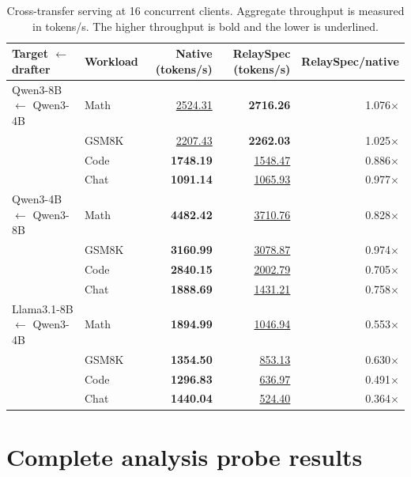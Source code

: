 \begin{table}[htbp]
\centering
\caption{Cross-transfer serving at 16 concurrent clients. Aggregate throughput is measured in tokens/s. The higher throughput is bold and the lower is underlined.}
\label{tab:transfer-serving}
\small
\begin{tabular}{llrrr}
\toprule
Target $\leftarrow$ drafter & Workload & Native (tokens/s) & RelaySpec (tokens/s) & RelaySpec/native \\
\midrule
Qwen3-8B $\leftarrow$ Qwen3-4B & Math & \underline{2524.31} & \textbf{2716.26} & 1.076$\times$ \\
 & GSM8K & \underline{2207.43} & \textbf{2262.03} & 1.025$\times$ \\
 & Code & \textbf{1748.19} & \underline{1548.47} & 0.886$\times$ \\
 & Chat & \textbf{1091.14} & \underline{1065.93} & 0.977$\times$ \\
\midrule
Qwen3-4B $\leftarrow$ Qwen3-8B & Math & \textbf{4482.42} & \underline{3710.76} & 0.828$\times$ \\
 & GSM8K & \textbf{3160.99} & \underline{3078.87} & 0.974$\times$ \\
 & Code & \textbf{2840.15} & \underline{2002.79} & 0.705$\times$ \\
 & Chat & \textbf{1888.69} & \underline{1431.21} & 0.758$\times$ \\
\midrule
Llama3.1-8B $\leftarrow$ Qwen3-4B & Math & \textbf{1894.99} & \underline{1046.94} & 0.553$\times$ \\
 & GSM8K & \textbf{1354.50} & \underline{853.13} & 0.630$\times$ \\
 & Code & \textbf{1296.83} & \underline{636.97} & 0.491$\times$ \\
 & Chat & \textbf{1440.04} & \underline{524.40} & 0.364$\times$ \\
\bottomrule
\end{tabular}
\end{table}

\section{Complete analysis probe results}
\label{app:analysis-probes}

\makeatletter
\setlength{\@fptop}{0pt}
\setlength{\@fpsep}{12pt}
\setlength{\@fpbot}{0pt plus 1fil}
\makeatother
\renewcommand{\topfraction}{0.95}
\renewcommand{\bottomfraction}{0.95}
\renewcommand{\textfraction}{0.05}
\renewcommand{\floatpagefraction}{0.8}
\setcounter{topnumber}{6}
\setcounter{bottomnumber}{6}
\setcounter{totalnumber}{10}


